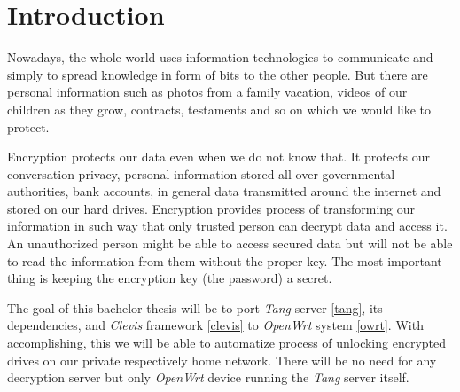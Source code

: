 \documentclass[../xdudla00-porting-Tang-to-Open-WRT.tex]{subfiles}
\begin{document}

\chapter{Introduction}\label{introduction}

Nowadays, the whole world uses information technologies to communicate and simply to spread knowledge in form of bits to the other people.
But there are personal information such as photos from a family vacation, videos of our children as they grow, contracts, testaments and so on which we would like to protect.

Encryption protects our data even when we do not know that.
It protects our conversation privacy, personal information stored all over governmental authorities, bank accounts, in general data transmitted around the internet and stored on our hard drives.
Encryption provides process of transforming our information in such way that only trusted person can decrypt data and access it.
An unauthorized person might be able to access secured data but will not be able to read the information from them without the proper key.
The most important thing is keeping the encryption key (the password) a secret.

The goal of this bachelor thesis will be to port %
{\it Tang} server \ref{tang}, its dependencies, and {\it Clevis} framework \ref{clevis} to {\it OpenWrt} system \ref{owrt}.
With accomplishing, this we will be able to automatize process of unlocking encrypted drives on our private respectively home network.
There will be no need for any decryption server but only {\it OpenWrt} device running the {\it Tang} server itself.
\end{document}

